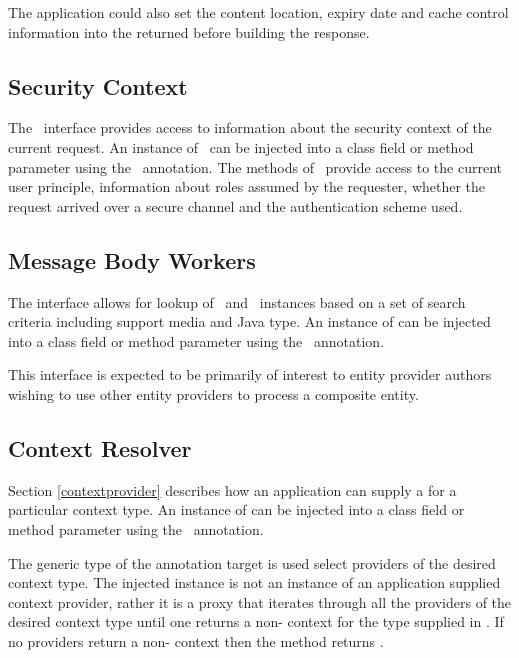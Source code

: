 The application could also set the content location, expiry date and cache control information into the returned  before building the response.

\subsection{Security Context}

The \SecurityContext\ interface provides access to information about the security context of the current request. An instance of \SecurityContext\ can be injected into a class field or method parameter using the \Context\ annotation. The methods of \SecurityContext\ provide access to the current user principle, information about roles assumed by the requester, whether the request arrived over a secure channel and the authentication scheme used.

\subsection{Message Body Workers}

The  interface allows for lookup of \MsgRead\ and \MsgWrite\ instances based on a set of search criteria including support media and Java type. An instance of  can be injected into a class field or method parameter using the \Context\ annotation.

This interface is expected to be primarily of interest to entity provider authors wishing to use other entity providers to process a composite entity.

\subsection{Context Resolver}
\label{contextresolver}

Section \ref{contextprovider} describes how an application can supply a  for a particular context type. An instance of  can be injected into a class field or method parameter using the \Context\ annotation. 

The generic type of the annotation target is used select providers of the desired context type. The injected instance is not an instance of an application supplied context provider, rather it is a proxy that iterates through all the providers of the desired context type until one returns a non- context for the type supplied in . If no providers return a non- context then the  method returns .
